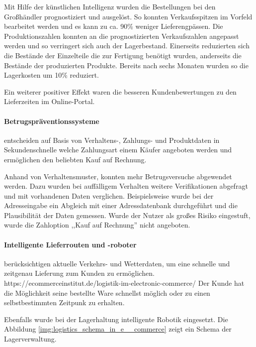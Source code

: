 Mit Hilfe der künstlichen Intelligenz wurden die Bestellungen bei den Großhändler prognostiziert und ausgelöst. So konnten Verkaufsspitzen im Vorfeld bearbeitet werden und es kann zu ca. 90\% weniger Lieferengpässen. Die Produktionszahlen konnten an die prognostizierten Verkaufszahlen angepasst werden und so verringert sich auch der Lagerbestand. Einerseits reduzierten sich die Bestände der Einzelteile die zur Fertigung benötigt wurden, anderseits die Bestände der produzierten Produkte. Bereits nach sechs Monaten wurden so die Lagerkosten um 10\% reduziert.\vspace{0.2cm}

Ein weiterer positiver Effekt waren die besseren Kundenbewertungen zu den Lieferzeiten im Online-Portal.

\paragraph{Betrugspräventionssysteme} entscheiden auf Basis von Verhaltens-, Zahlungs- und Produktdaten in Sekundenschnelle welche Zahlungsart einem Käufer angeboten werden und ermöglichen den beliebten Kauf auf Rechnung.\vspace{0.2cm}

Anhand von Verhaltensmuster, konnten mehr Betrugsversuche abgewendet werden. Dazu wurden bei auffälligem Verhalten weitere Verifikationen abgefragt und mit vorhandenen Daten verglichen. Beispielsweise wurde bei der Adresseingabe ein Abgleich mit einer Adressdatenbank durchgeführt und die Plausibilität der Daten gemessen. Wurde der Nutzer als großes Risiko eingestuft, wurde die Zahloption ,,Kauf auf Rechnung'' nicht angeboten.

\paragraph{Intelligente Lieferrouten und -roboter} berücksichtigen aktuelle Verkehrs- und Wetterdaten, um eine schnelle und zeitgenau Lieferung zum Kunden zu ermöglichen.
https://ecommerceinstitut.de/logistik-im-electronic-commerce/
Der Kunde hat die Möglichkeit seine bestellte Ware schnellst möglich oder zu einen selbstbestimmten Zeitpunk zu erhalten.\vspace{0.2cm}

Ebenfalls wurde bei der Lagerhaltung intelligente Robotik eingesetzt. Die Abbildung \ref{img:logistics_schema_in_e__commerce} zeigt ein Schema der Lagerverwaltung.

